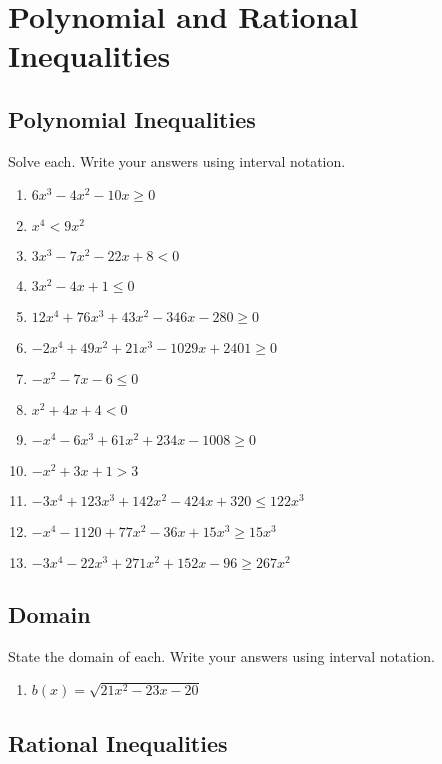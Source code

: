 \chapter{Polynomial and Rational Inequalities}

\section{Polynomial Inequalities}

Solve each. Write your answers using interval notation.
\begin{multicols}{2}
\begin{enumerate}
\item $6x^3-4x^2-10x \geq 0$
\item $x^4 < 9x^2$
\item $3x^3-7x^2-22x+8 < 0$
\item $3x^2 - 4x + 1 \leq 0$
\item $12x^4 + 76x^3 + 43x^2 - 346x - 280 \geq 0$
\item $-2x^4 + 49x^2 + 21x^3 - 1029x + 2401 \geq 0$
\item $-x^2 - 7x - 6 \leq 0$
\item $x^2 + 4x + 4 < 0$
\item $-x^4 - 6x^3 + 61x^2 + 234x - 1008 \geq 0$
\item $-x^2 + 3x + 1 > 3$
\item $-3x^4 + 123x^3 + 142x^2 - 424x + 320 \leq 122x^3$
\item $-x^4 - 1120 + 77x^2 - 36x + 15x^3 \geq 15x^3$
\item $-3x^4 - 22x^3 + 271x^2 + 152x - 96 \geq 267x^2$
\end{enumerate}
\end{multicols}

\section{Domain}

State the domain of each. Write your answers using interval notation.
\begin{enumerate}
\item $b(x) = \sqrt{21x^2 - 23x - 20}$
\end{enumerate}

\section{Rational Inequalities}

